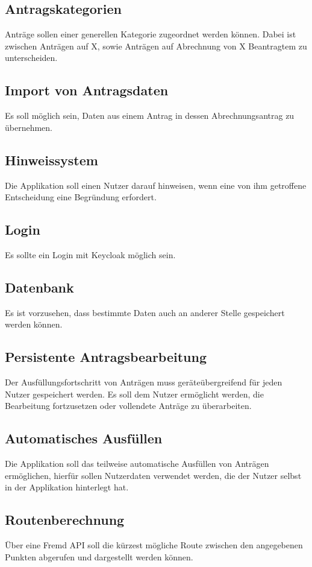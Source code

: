 \subsection{Antragskategorien}\label{subsec:antrags-kategorien}
Anträge sollen einer generellen Kategorie zugeordnet werden können.
Dabei ist zwischen Anträgen auf X, sowie Anträgen auf Abrechnung von X Beantragtem zu unterscheiden.
\subsection{Import von Antragsdaten}\label{subsec:import-von-antragsdaten}
Es soll möglich sein, Daten aus einem Antrag in dessen Abrechnungsantrag zu übernehmen.
\subsection{Hinweissystem}\label{subsec:hinweis-system}
Die Applikation soll einen Nutzer darauf hinweisen, wenn eine von ihm getroffene Entscheidung eine Begründung erfordert.
\subsection{Login}\label{subsec:login}
Es sollte ein Login mit Keycloak möglich sein.
\subsection{Datenbank}\label{subsec:datenbank}
Es ist vorzusehen, dass bestimmte Daten auch an anderer Stelle gespeichert werden können.
\subsection{Persistente Antragsbearbeitung}\label{subsec:persistente-antragsbearbeitung}
Der Ausfüllungsfortschritt von Anträgen muss geräteübergreifend für jeden Nutzer gespeichert werden.
Es soll dem Nutzer ermöglicht werden, die Bearbeitung fortzusetzen oder vollendete Anträge zu überarbeiten.
\subsection{Automatisches Ausfüllen}\label{subsec:automatisches-ausfullen}
Die Applikation soll das teilweise automatische Ausfüllen von Anträgen ermöglichen, hierfür sollen Nutzerdaten verwendet werden,
die der Nutzer selbst in der Applikation hinterlegt hat.
\subsection{Routenberechnung}\label{subsec:routenberechnung}
Über eine Fremd \ac{API} soll die kürzest mögliche Route zwischen den angegebenen Punkten abgerufen und dargestellt werden können.
